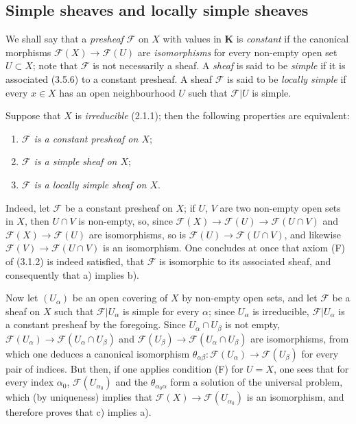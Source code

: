 \subsection{Simple sheaves and locally simple sheaves}

\begin{env}[3.6.1]
\label{0.3.6.1}
We shall say that a \emph{presheaf} $\mathcal{F}$ on $X$ with values in
$\mathbf{K}$ is \emph{constant} if the canonical morphisms
$\mathcal{F}(X)\to\mathcal{F}(U)$ are \emph{isomorphisms} for every
non-empty open set $U\subset X$; note that $\mathcal{F}$ is not
necessarily a sheaf. A \emph{sheaf} is said to be \emph{simple}
if it is associated (3.5.6) to a constant presheaf. A sheaf
$\mathcal{F}$ is said to be \emph{locally simple} if every $x\in X$ has an
open neighbourhood $U$ such that $\mathcal{F}|U$ is simple.
\end{env}

\begin{env}[3.6.2]
\label{0.3.6.2}
Suppose that $X$ is \emph{irreducible} (2.1.1); then the following
properties are equivalent:
\begin{enumerate}
  \item[a)] \emph{$\mathcal{F}$ is a constant presheaf on $X$};
  \item[b)] \emph{$\mathcal{F}$ is a simple sheaf on $X$};
  \item[c)] \emph{$\mathcal{F}$ is a locally simple sheaf on $X$}.
\end{enumerate}

Indeed, let $\mathcal{F}$ be a constant presheaf on $X$; if $U$, $V$
are two non-empty open sets in $X$, then $U\cap V$ is non-empty, so, since
$\mathcal{F}(X)\to\mathcal{F}(U)\to\mathcal{F}(U\cap V)$ and
$\mathcal{F}(X)\to\mathcal{F}(U)$ are isomorphisms, so is
$\mathcal{F}(U)\to\mathcal{F}(U\cap V)$, and likewise
$\mathcal{F}(V)\to\mathcal{F}(U\cap V)$ is an isomorphism. One concludes
at once that axiom (F) of (3.1.2) is indeed satisfied, that $\mathcal{F}$ is
isomorphic to its associated sheaf, and consequently that a) implies b).

Now let $(U_\alpha)$ be an open covering of $X$ by non-empty open sets,
and let $\mathcal{F}$ be a sheaf on $X$ such that
$\mathcal{F}|U_\alpha$ is simple for every $\alpha$; since $U_\alpha$ is
irreducible, $\mathcal{F}|U_\alpha$ is a constant presheaf by
the foregoing. Since $U_\alpha\cap U_\beta$ is not empty,
$\mathcal{F}(U_\alpha)\to\mathcal{F}(U_\alpha\cap U_\beta)$ and
$\mathcal{F}(U_\beta)\to\mathcal{F}(U_\alpha\cap U_\beta)$ are
isomorphisms, from which one deduces a canonical isomorphism
$\theta_{\alpha\beta}:\mathcal{F}(U_\alpha)\to\mathcal{F}(U_\beta)$ for every
pair of indices. But then, if one applies condition (F) for $U=X$, one
sees that for every index $\alpha_0$, $\mathcal{F}(U_{\alpha_0})$ and the
$\theta_{\alpha_0\alpha}$ form a solution of the universal problem, which
(by uniqueness) implies that
$\mathcal{F}(X)\to\mathcal{F}(U_{\alpha_0})$ is an isomorphism, and therefore
proves that c) implies a).
\end{env}

